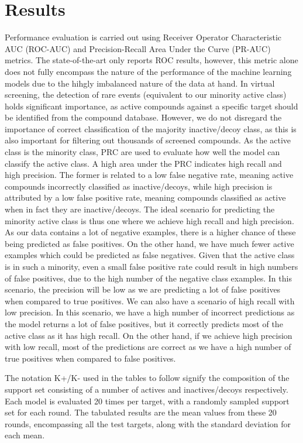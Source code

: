 \documentclass[journal=acscii,manuscript=article]{achemso}
\begin{document}
\section{Results}

Performance evaluation is carried out using Receiver Operator Characteristic AUC (ROC-AUC) and Precision-Recall Area Under the Curve (PR-AUC) metrics. The state-of-the-art \cite{altae2017low} only reports ROC results, however, this metric alone does not fully encompass the nature of the performance of the machine learning models due to the hihgly imbalanced nature of the data at hand. In virtual screening, the detection of rare events (equivalent to our minority active class) holds significant importance, as active compounds against a specific target should be identified from the compound database. However, we do not disregard the importance of correct classification of the majority inactive/decoy class, as this is also important for filtering out thousands of screened compounds. As the active class is the minority class, PRC are used to evaluate how well the model can classify the active class. A high area under the PRC indicates high recall and high precision. The former is related to a low false negative rate, meaning active compounds incorrectly classified as inactive/decoys, while high precision is attributed by a low false positive rate, meaning compounds classified as active when in fact they are inactive/decoys. The ideal scenario for predicting the minority active class is thus one where we achieve high recall and high precision. As our data contains a lot of negative examples, there is a higher chance of these being predicted as false positives. On the other hand, we have much fewer active examples which could be predicted as false negatives. Given that the active class is in such a minority, even a small false positive rate could result in high numbers of false positives, due to the high number of the negative class examples. In this scenario, the precision will be low as we are predicting a lot of false positives when compared to true positives. We can also have a scenario of high recall with low precision. In this scenario, we have a high number of incorrect predictions as the model returns a lot of false positives, but it correctly predicts most of the active class as it has high recall. On the other hand, if we achieve high precision with low recall, most of the predictions are correct as we have a high number of true positives when compared to false positives.

The notation K+/K- used in the tables to follow signify the composition of the support set consisting of a number of actives and inactives/decoys respectively. Each model is evaluated 20 times per target, with a randomly sampled support set for each round. The tabulated results are the mean values from these 20 rounds, encompassing all the test targets, along with the standard deviation for each mean.
\end{document}
